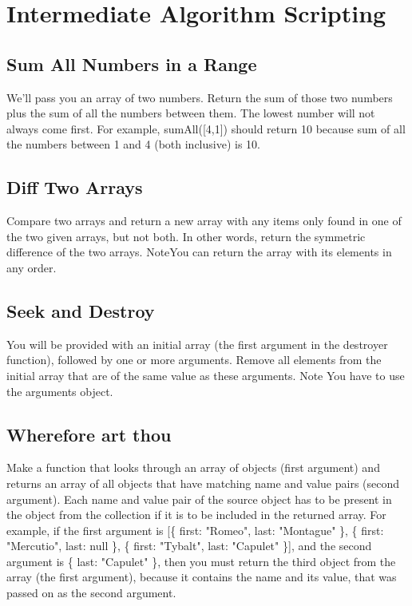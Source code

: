 \documentclass{article}%
\begin{document}
%
\newpage%
\section{Intermediate Algorithm Scripting}%
\label{sec:IntermediateAlgorithmScripting}%
\subsection{Sum All Numbers in a Range}%
\label{subsec:SumAllNumbersinaRange}%
We'll pass you an array of two numbers. Return the sum of those two numbers plus the sum of all the numbers between them. The lowest number will not always come first.\newline%
For example, sumAll({[}4,1{]}) should return 10 because sum of all the numbers between 1 and 4 (both inclusive) is 10.\newline%

%
\subsection{Diff Two Arrays}%
\label{subsec:DiffTwoArrays}%
Compare two arrays and return a new array with any items only found in one of the two given arrays, but not both. In other words, return the symmetric difference of the two arrays.\newline%
NoteYou can return the array with its elements in any order.\newline%

%
\subsection{Seek and Destroy}%
\label{subsec:SeekandDestroy}%
You will be provided with an initial array (the first argument in the destroyer function), followed by one or more arguments. Remove all elements from the initial array that are of the same value as these arguments.\newline%
Note You have to use the arguments object.\newline%

%
\subsection{Wherefore art thou}%
\label{subsec:Whereforeartthou}%
Make a function that looks through an array of objects (first argument) and returns an array of all objects that have matching name and value pairs (second argument). Each name and value pair of the source object has to be present in the object from the collection if it is to be included in the returned array.\newline%
For example, if the first argument is {[}\{ first: "Romeo", last: "Montague" \}, \{ first: "Mercutio", last: null \}, \{ first: "Tybalt", last: "Capulet" \}{]}, and the second argument is \{ last: "Capulet" \}, then you must return the third object from the array (the first argument), because it contains the name and its value, that was passed on as the second argument.\newline%
\end{document}
